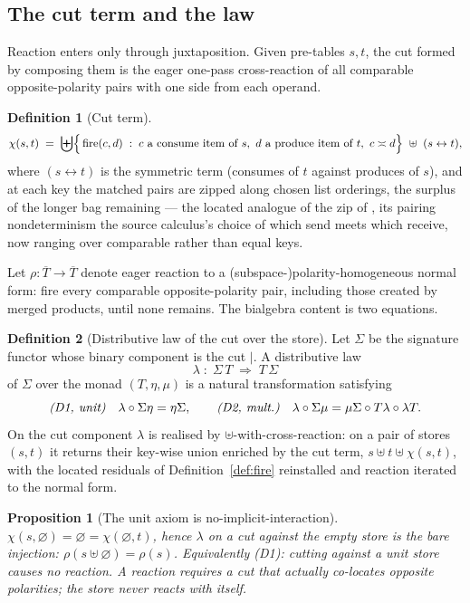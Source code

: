 \documentclass[11pt]{article}
\theoremstyle{plain}
\newtheorem{proposition}{Proposition}
\theoremstyle{definition}
\newtheorem{definition}{Definition}
\newcommand{\comp}{\mathrel{\asymp}}            %
\newcommand{\cut}{\chi}
\newcommand{\React}{\rho}
\newcommand{\Sig}{\Sigma}
\begin{document}
\subsection{The cut term and the law}

Reaction enters only through juxtaposition. Given pre-tables $s,t$, the cut formed by composing them
is the eager one-pass cross-reaction of all comparable opposite-polarity pairs with one side from
each operand.

\begin{definition}[Cut term]\label{def:cutterm}
\[
  \cut(s,t)\;=\;
  \biguplus
  \Bigl\{\,
    \mathrm{fire}(c,d)\;:\;
    c\ \text{a consume item of }s,\ d\ \text{a produce item of }t,\ c\comp d
  \Bigr\}
  \ \uplus\ (s\leftrightarrow t),
\]
where $(s\leftrightarrow t)$ is the symmetric term (consumes of $t$ against produces of $s$), and at
each key the matched pairs are zipped along chosen list orderings, the surplus of the longer bag
remaining --- the located analogue of the zip of \cite{KnotRho}, its pairing nondeterminism the
source calculus's choice of which send meets which receive, now ranging over comparable rather than
equal keys.
\end{definition}

Let $\React\colon\overline T\to\overline T$ denote eager reaction to a (subspace-)polarity-homogeneous
normal form: fire every comparable opposite-polarity pair, including those created by merged products,
until none remains. The bialgebra content is two equations.

\begin{definition}[Distributive law of the cut over the store]\label{def:dist}
Let $\Sig$ be the signature functor whose binary component is the cut $\mid$. A distributive law
\[
  \lambda\;\colon\;\Sig\,T\;\Longrightarrow\;T\,\Sig
\]
of $\Sig$ over the monad $(T,\eta,\mu)$ is a natural transformation satisfying
\[
  \text{\emph{(D1, unit)}}\quad \lambda\circ\Sig\eta=\eta\Sig,
  \qquad
  \text{\emph{(D2, mult.)}}\quad \lambda\circ\Sig\mu=\mu\Sig\circ T\lambda\circ\lambda T.
\]
On the cut component $\lambda$ is realised by $\uplus$-with-cross-reaction: on a pair of stores
$(s,t)$ it returns their key-wise union enriched by the cut term, $s\uplus t\uplus\cut(s,t)$, with the
located residuals of Definition~\ref{def:fire} reinstalled and reaction iterated to the normal form.
\end{definition}

\begin{proposition}[The unit axiom is no-implicit-interaction]\label{prop:unit}
$\cut(s,\varnothing)=\varnothing=\cut(\varnothing,t)$, hence $\lambda$ on a cut against the empty
store is the bare injection: $\React(s\uplus\varnothing)=\React(s)$. Equivalently \emph{(D1)}: cutting
against a unit store causes no reaction. A reaction requires a cut that actually co-locates opposite
polarities; the store never reacts with itself.
\end{proposition}
\end{document}
